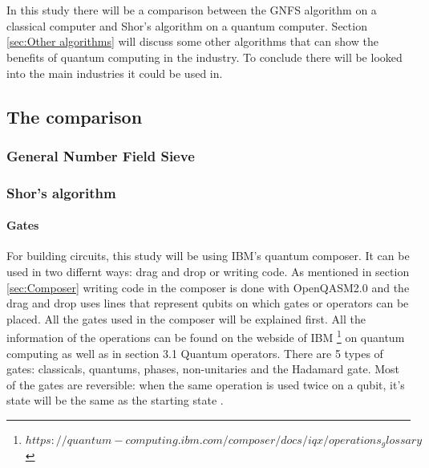 
\chapter{}
\label{ch:onderzoek}



In this study there will be a comparison between the GNFS algorithm on a classical computer and Shor's algorithm on a quantum computer.
Section \ref{sec:Other algorithms} will discuss some other algorithms that can show the benefits of quantum computing in the industry. To conclude there will be looked into the main industries it could be used in.

\section{The comparison}
\subsection{General Number Field Sieve}
\subsection{Shor's algorithm}
\subsubsection{Gates}
\label{subsubsec:gates}
For building circuits, this study will be using IBM's quantum composer. It can be used in two differnt ways: drag and drop or writing code.
As mentioned in section \ref{sec:Composer} writing code in the composer is done with OpenQASM2.0 and the drag and drop uses lines that represent qubits on which gates or operators can be placed.
All the gates used in the composer will be explained first. All the information of the operations can be found on the webside of IBM \footnote{$https://quantum-computing.ibm.com/composer/docs/iqx/operations_glossary$} on quantum computing as well as in \textcite{Hidary_2019} section 3.1 Quantum operators.
There are 5 types of gates: classicals, quantums, phases, non-unitaries and the Hadamard gate. Most of the gates are reversible: when the same operation is used twice on a qubit, it's state will be the same as the starting state \autocite{reversible_gates, revgates}.


